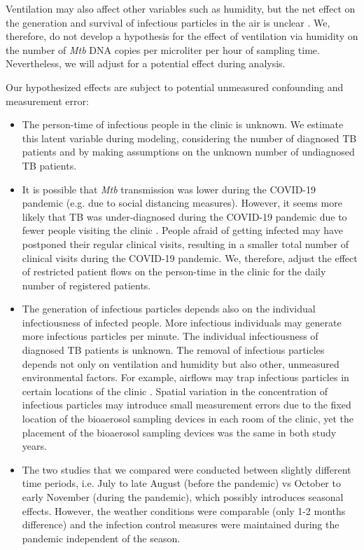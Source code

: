 \documentclass{article}
\begin{document}
Ventilation may also affect other variables such as humidity, but the net effect on the generation and survival of infectious particles in the air is unclear \cite{Wang2021Science}. We, therefore, do not develop a hypothesis for the effect of ventilation via humidity on the number of \emph{Mtb} DNA copies per microliter per hour of sampling time. Nevertheless, we will adjust for a potential effect during analysis.

Our hypothesized effects are subject to potential unmeasured confounding and measurement error: 

\begin{itemize}
    \item The person-time of infectious people in the clinic is unknown. We estimate this latent variable during modeling, considering the number of diagnosed TB patients and by making assumptions on the unknown number of undiagnosed TB patients. 
    \item It is possible that \emph{Mtb} transmission was lower during the COVID-19 pandemic (e.g. due to social distancing measures). However, it seems more likely that TB was under-diagnosed during the COVID-19 pandemic due to fewer people visiting the clinic \cite{Soko2021EID,Pillay2021SAMJ,Uwishema2022DMPHP}. People afraid of getting infected may have postponed their regular clinical visits, resulting in a smaller total number of clinical visits during the COVID-19 pandemic. We, therefore, adjust the effect of restricted patient flows on the person-time in the clinic for the daily number of registered patients.
    \item The generation of infectious particles depends also on the individual infectiousness of infected people. More infectious individuals may generate more infectious particles per minute. The individual infectiousness of diagnosed TB patients is unknown.
	The removal of infectious particles depends not only on ventilation and humidity but also other, unmeasured environmental factors. For example, airflows may trap infectious particles in certain locations of the clinic \cite{Wang2021Science}. Spatial variation in the concentration of infectious particles may introduce small measurement errors due to the fixed location of the bioaerosol sampling devices in each room of the clinic, yet the placement of the bioaerosol sampling devices was the same in both study years.
    \item The two studies that we compared were conducted between slightly different time periods, i.e. July to late August (before the pandemic) vs October to early November (during the pandemic), which possibly introduces seasonal effects. However, the weather conditions were comparable (only 1-2 months difference) and the infection control measures were maintained during the pandemic independent of the season.
\end{itemize}
\end{document}
